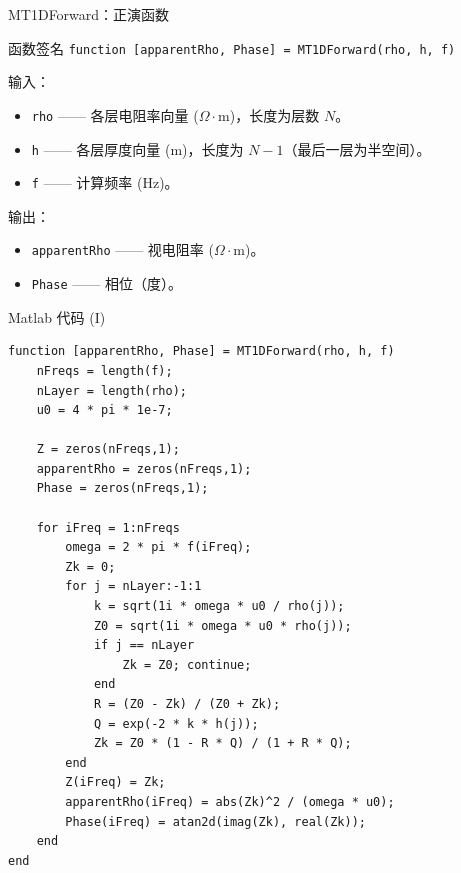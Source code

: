 \documentclass[10pt,aspectratio=169,fontset=none]{ctexbeamer}
\begin{document}
    \begin{frame}{MT1DForward：正演函数}
        \begin{tblock}{函数签名}
            \texttt{function [apparentRho, Phase] = MT1DForward(rho, h, f)}
        \end{tblock}
        输入：
        \begin{itemize}
            \item \texttt{rho} —— 各层电阻率向量 ($\Omega\cdot\mathrm{m}$)，长度为层数 $N$。
            \item \texttt{h} —— 各层厚度向量 ($\mathrm{m}$)，长度为 $N-1$（最后一层为半空间）。
            \item \texttt{f} —— 计算频率 ($\mathrm{Hz}$)。
        \end{itemize}
        输出：
        \begin{itemize}
            \item \texttt{apparentRho} —— 视电阻率 ($\Omega\cdot\mathrm{m}$)。
            \item \texttt{Phase} —— 相位（度）。
        \end{itemize}
    \end{frame}

    \begin{frame}[fragile]{Matlab 代码 (I)}
        \begin{verbatim}
function [apparentRho, Phase] = MT1DForward(rho, h, f)
    nFreqs = length(f);
    nLayer = length(rho);
    u0 = 4 * pi * 1e-7;

    Z = zeros(nFreqs,1);
    apparentRho = zeros(nFreqs,1);
    Phase = zeros(nFreqs,1);

    for iFreq = 1:nFreqs
        omega = 2 * pi * f(iFreq);
        Zk = 0;
        for j = nLayer:-1:1
            k = sqrt(1i * omega * u0 / rho(j));
            Z0 = sqrt(1i * omega * u0 * rho(j));
            if j == nLayer
                Zk = Z0; continue;
            end
            R = (Z0 - Zk) / (Z0 + Zk);
            Q = exp(-2 * k * h(j));
            Zk = Z0 * (1 - R * Q) / (1 + R * Q);
        end
        Z(iFreq) = Zk;
        apparentRho(iFreq) = abs(Zk)^2 / (omega * u0);
        Phase(iFreq) = atan2d(imag(Zk), real(Zk));
    end
end
        \end{verbatim}
    \end{frame}
\end{document}
